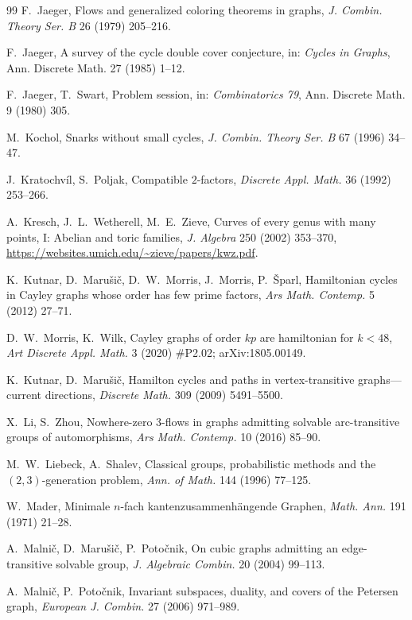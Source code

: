 \documentclass[11pt,a4paper]{article}
\theoremstyle{definition}
\theoremstyle{remark}
\begin{document}
\begin{thebibliography}{99}
 F.~Jaeger, Flows and generalized coloring theorems in graphs, \emph{J. Combin. Theory Ser. B} 26 (1979) 205--216.

 F.~Jaeger, A survey of the cycle double cover conjecture, in: \emph{Cycles in Graphs}, Ann. Discrete Math. 27 (1985) 1--12.

 F.~Jaeger, T.~Swart, Problem session, in: \emph{Combinatorics 79}, Ann. Discrete Math. 9 (1980) 305.

 M.~Kochol, Snarks without small cycles, \emph{J. Combin. Theory Ser. B} 67 (1996) 34--47.

 J.~Kratochv\'il, S.~Poljak, Compatible $2$-factors, \emph{Discrete Appl. Math.} 36 (1992) 253--266.

 A.~Kresch, J.~L.~Wetherell, M.~E.~Zieve, Curves of every genus with many points, I: Abelian and toric families, \emph{J. Algebra} 250 (2002) 353--370, \url{https://websites.umich.edu/~zieve/papers/kwz.pdf}.

 K.~Kutnar, D.~Maru\v{s}i\v{c}, D.~W.~Morris, J.~Morris, P.~\v{S}parl, Hamiltonian cycles in Cayley graphs whose order has few prime factors, \emph{Ars Math. Contemp.} 5 (2012) 27--71.

 D.~W.~Morris, K.~Wilk, Cayley graphs of order $kp$ are hamiltonian for $k<48$, \emph{Art Discrete Appl. Math.} 3 (2020) \#P2.02; arXiv:1805.00149.

 K.~Kutnar, D.~Maru\v{s}i\v{c}, Hamilton cycles and paths in vertex-transitive graphs---current directions, \emph{Discrete Math.} 309 (2009) 5491--5500.

 X.~Li, S.~Zhou, Nowhere-zero 3-flows in graphs admitting solvable arc-transitive groups of automorphisms, \emph{Ars Math. Contemp.} 10 (2016) 85--90.

 M.~W.~Liebeck, A.~Shalev, Classical groups, probabilistic methods and the $(2,3)$-generation problem, \emph{Ann. of Math.} 144 (1996) 77--125.

 W.~Mader, Minimale $n$-fach kantenzusammenh\"angende Graphen, \emph{Math. Ann.} 191 (1971) 21--28.

 A.~Malni\v{c}, D.~Maru\v{s}i\v{c}, P.~Poto\v{c}nik, On cubic graphs admitting an edge-transitive solvable group, \emph{J. Algebraic Combin.} 20 (2004) 99--113.

 A.~Malni\v{c}, P.~Poto\v{c}nik, Invariant subspaces, duality, and covers of the Petersen graph, \emph{European J. Combin.} 27 (2006) 971--989.


\end{thebibliography}
\end{document}
